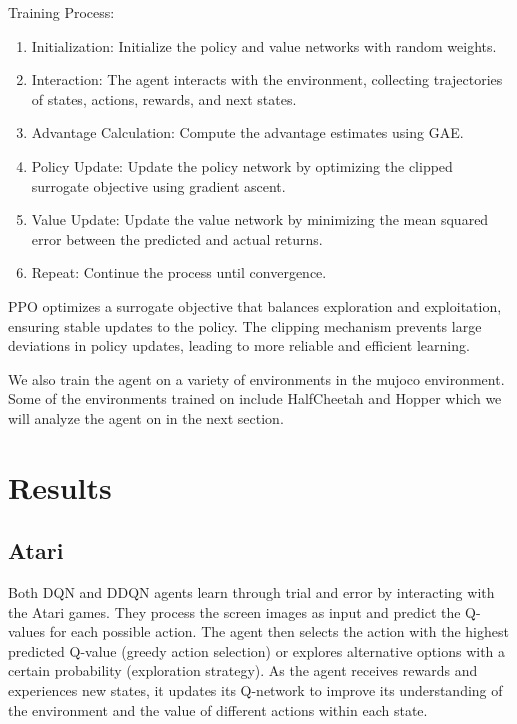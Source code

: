 \documentclass{article}
\begin{document}
Training Process:

\begin{enumerate}
    \item Initialization: Initialize the policy and value networks with random weights.
    \item Interaction: The agent interacts with the environment, collecting trajectories of states, actions, rewards, and next states.
    \item Advantage Calculation: Compute the advantage estimates using GAE.
    \item Policy Update: Update the policy network by optimizing the clipped surrogate objective using gradient ascent.
    \item Value Update: Update the value network by minimizing the mean squared error between the predicted and actual returns.
    \item Repeat: Continue the process until convergence.
\end{enumerate}

PPO optimizes a surrogate objective that balances exploration and exploitation,
ensuring stable updates to the policy. The clipping mechanism prevents large
deviations in policy updates, leading to more reliable and efficient learning.

We also train the agent on a variety of environments in the mujoco environment.
Some of the environments trained on include HalfCheetah and Hopper which we
will analyze the agent on in the next section.

\newpage

\section*{Results}

\subsection*{Atari}

Both DQN and DDQN agents learn through trial and error by interacting with the
Atari games. They process the screen images as input and predict the Q-values
for each possible action. The agent then selects the action with the highest
predicted Q-value (greedy action selection) or explores alternative options
with a certain probability (exploration strategy). As the agent receives
rewards and experiences new states, it updates its Q-network to improve its
understanding of the environment and the value of different actions within each
state.
\end{document}
